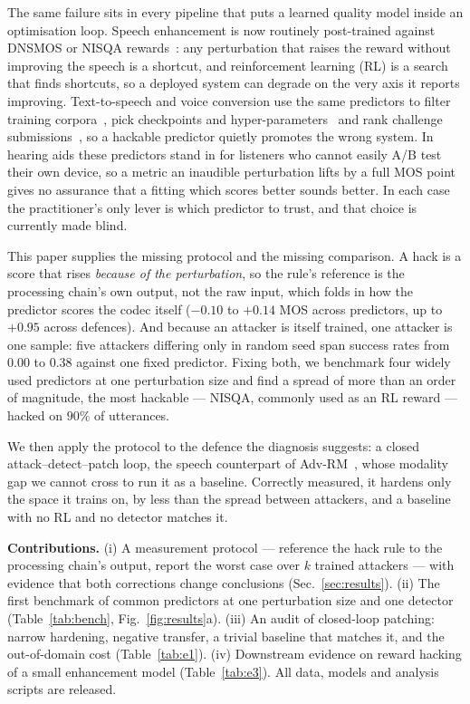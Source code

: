 \documentclass[conference]{IEEEtran}
\begin{document}
The same failure sits in every pipeline that puts a learned quality model inside an optimisation loop. Speech
enhancement is now routinely post-trained against DNSMOS or NISQA
rewards~\cite{wang2026flowsegrpo,wang2025sqase}: any perturbation that raises the reward without improving the
speech is a shortcut, and reinforcement learning (RL) is a search that finds shortcuts, so a deployed system can degrade on the very axis
it reports improving. Text-to-speech and voice conversion use the same predictors to filter training
corpora~\cite{he2024emilia,ma2024wenetspeech4tts}, pick checkpoints and
hyper-parameters~\cite{peirolilja2022monitoring,nakata2024utduss} and rank challenge
submissions~\cite{chang2024discrete}, so a hackable predictor quietly promotes the wrong system. In hearing aids these predictors stand in for
listeners who cannot easily A/B test their own device, so a metric an inaudible perturbation lifts by a full MOS
point gives no assurance that a fitting which scores better sounds better. In each case the practitioner's only
lever is which predictor to trust, and that choice is currently made blind.

This paper supplies the missing protocol and the missing comparison. A hack is a score that rises
\emph{because of the perturbation}, so the rule's reference is the processing chain's own output, not the raw
input, which folds in how the predictor scores the codec itself ($-0.10$ to $+0.14$ MOS across predictors, up to
$+0.95$ across defences). And because an attacker is itself trained, one attacker is one sample: five attackers
differing only in random seed span success rates from $0.00$ to $0.38$ against one fixed predictor. Fixing both,
we benchmark four widely used predictors at one perturbation size and find a spread of more than an order of
magnitude, the most hackable --- NISQA, commonly used as an RL reward --- hacked on $90\%$ of utterances.

We then apply the protocol to the defence the diagnosis suggests: a closed attack--detect--patch loop, the
speech counterpart of Adv-RM~\cite{bukharin2025advrm}, whose modality gap we cannot cross to run it as a
baseline. Correctly measured, it hardens only the space it trains on, by less than the spread between attackers,
and a baseline with no RL and no detector matches it.

\noindent\textbf{Contributions.} (i) A measurement protocol --- reference the hack rule to the processing
chain's output, report the worst case over $k$ trained attackers --- with evidence that both corrections change
conclusions (Sec.~\ref{sec:results}). (ii) The first benchmark of common predictors at one perturbation size and
one detector (Table~\ref{tab:bench}, Fig.~\ref{fig:results}a). (iii) An audit of closed-loop patching: narrow
hardening, negative transfer, a trivial baseline that matches it, and the out-of-domain cost
(Table~\ref{tab:e1}). (iv) Downstream evidence on reward hacking of a small enhancement model
(Table~\ref{tab:e3}). All data, models and analysis scripts are released.
\end{document}
